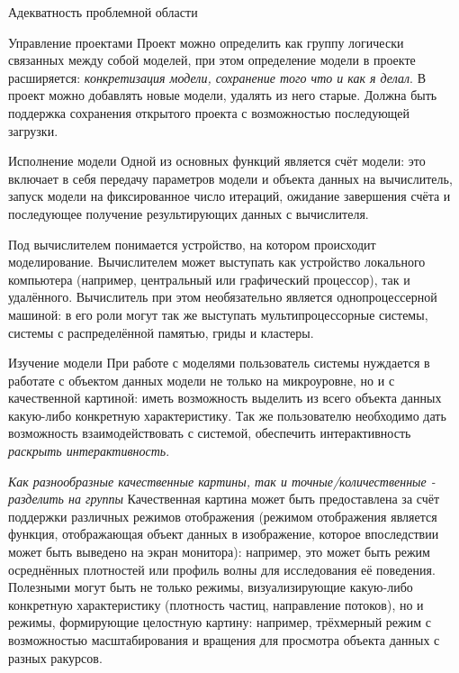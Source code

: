 \documentclass[a4paper,12pt]{extarticle}
\begin{document}
\begin{subsection}{Адекватность проблемной области}
\begin{subsubsection}{Управление проектами}
        Проект можно определить как группу логически связанных между собой моделей, при этом определение модели в проекте расширяется: \textit{конкретизация модели, сохранение того что и как я делал}. В проект можно добавлять новые модели, удалять из него старые. Должна быть поддержка сохранения открытого проекта с возможностью последующей загрузки.
    \end{subsubsection}
        
    \begin{subsubsection}{Исполнение модели} 
        Одной из основных функций является счёт модели: это включает в себя передачу параметров модели и объекта данных на вычислитель, запуск модели на фиксированное число итераций, ожидание завершения счёта и последующее получение результирующих данных с вычислителя.
        
        Под вычислителем понимается устройство, на котором происходит моделирование. Вычислителем может выступать как устройство локального компьютера (например, центральный или графический процессор), так и удалённого. Вычислитель при этом необязательно является однопроцессерной машиной: в его роли могут так же выступать мультипроцессорные системы, системы с распределённой памятью, гриды и кластеры.
    \end{subsubsection}
        
    \begin{subsubsection}{Изучение модели}
        При работе с моделями пользователь системы нуждается в  работате с объектом данных модели не только на микроуровне, но и с качественной картиной: иметь возможность выделить из всего объекта данных какую-либо конкретную характеристику. Так же пользователю необходимо дать возможность взаимодействовать с системой, обеспечить интерактивность \textit{раскрыть интерактивность}.
        
        \textit{Как разнообразные качественные картины, так и точные/количественные - разделить на группы} Качественная картина может быть предоставлена за счёт поддержки различных режимов отображения (режимом отображения является функция, отображающая объект данных в изображение, которое впоследствии может быть выведено на экран монитора): например, это может быть режим осреднённых плотностей или профиль волны для исследования её поведения. Полезными могут быть не только режимы, визуализирующие какую-либо конкретную характеристику (плотность частиц, направление потоков), но и режимы, формирующие целостную картину: например, трёхмерный режим с возможностью масштабирования и вращения для просмотра объекта данных с разных ракурсов.
    \end{subsubsection}
        

\end{subsection}
\end{document}
